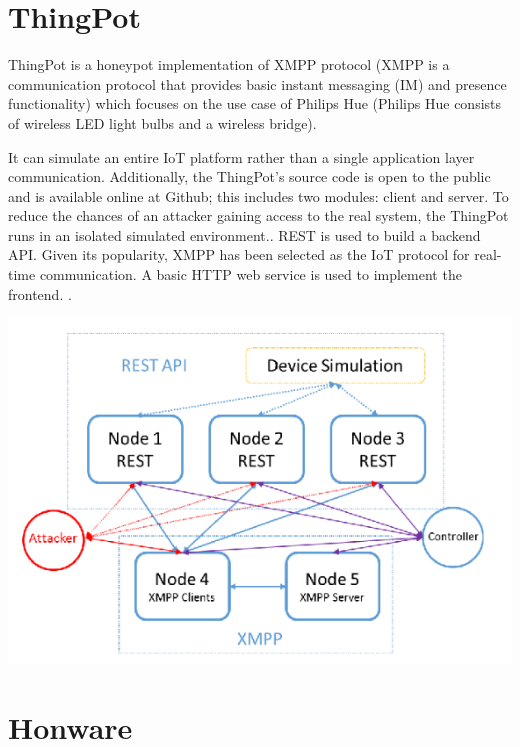 \documentclass[epsfig,a4paper,11pt,titlepage,oneside,openany]{book}
\begin{document}
\section{ThingPot}
ThingPot is a honeypot implementation of XMPP protocol (XMPP is a communication protocol that provides basic instant messaging (IM) and presence functionality) which focuses on the use case of Philips Hue (Philips Hue consists of wireless LED light bulbs and a wireless bridge).

It can simulate an entire IoT platform rather than a single application layer communication. Additionally, the ThingPot’s source code is open to the public and is available online at Github; this includes two modules: client and server. To reduce the chances of an attacker gaining access to the real system, the ThingPot runs in an isolated simulated environment.. REST is used to build a backend API. Given its popularity, XMPP has been selected as the IoT protocol for real-time communication. A basic HTTP web service is used to implement the frontend. \cite{wang2018thingpot}.
\begin{center}
\includegraphics[scale=0.40]{thingpot}
\end{center}


\section{Honware}
\end{document}
